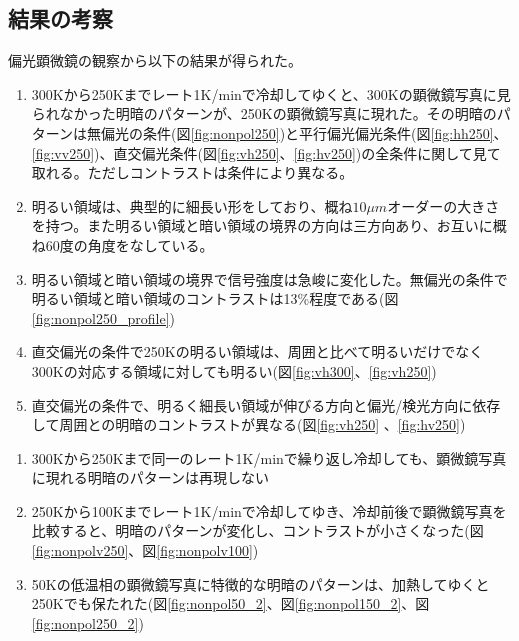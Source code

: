 \documentclass[11pt,a4paper]{jsarticle}
\begin{document}
\subsection{結果の考察}
偏光顕微鏡の観察から以下の結果が得られた。
\begin{description}
\item[300Kと250Kの偏光顕微鏡像の比較]
\item
\begin{enumerate}
\item 300Kから250Kまでレート1K/minで冷却してゆくと、300Kの顕微鏡写真に見られなかった明暗のパターンが、250Kの顕微鏡写真に現れた。その明暗のパターンは無偏光の条件(図\ref{fig:nonpol250})と平行偏光偏光条件(図\ref{fig:hh250}、\ref{fig:vv250})、直交偏光条件(図\ref{fig:vh250}、\ref{fig:hv250})の全条件に関して見て取れる。ただしコントラストは条件により異なる。
\item 明るい領域は、典型的に細長い形をしており、概ね$10 \mu m$オーダーの大きさを持つ。また明るい領域と暗い領域の境界の方向は三方向あり、お互いに概ね60度の角度をなしている。
\item 明るい領域と暗い領域の境界で信号強度は急峻に変化した。無偏光の条件で明るい領域と暗い領域のコントラストは13\%程度である(図\ref{fig:nonpol250_profile})
\item 直交偏光の条件で250Kの明るい領域は、周囲と比べて明るいだけでなく300Kの対応する領域に対しても明るい(図\ref{fig:vh300}、\ref{fig:vh250})
\item 直交偏光の条件で、明るく細長い領域が伸びる方向と偏光/検光方向に依存して周囲との明暗のコントラストが異なる(図\ref{fig:vh250} 、\ref{fig:hv250})
 \end{enumerate}
\item[250Kと50Kの偏光顕微鏡像の比較]
\item 
\begin{enumerate}
\item 300Kから250Kまで同一のレート1K/minで繰り返し冷却しても、顕微鏡写真に現れる明暗のパターンは再現しない
\item 250Kから100Kまでレート1K/minで冷却してゆき、冷却前後で顕微鏡写真を比較すると、明暗のパターンが変化し、コントラストが小さくなった(図\ref{fig:nonpolv250}、図\ref{fig:nonpolv100})
\item 50Kの低温相の顕微鏡写真に特徴的な明暗のパターンは、加熱してゆくと250Kでも保たれた(図\ref{fig:nonpol50_2}、図\ref{fig:nonpol150_2}、図\ref{fig:nonpol250_2})
 \end{enumerate}
 \end{description}
 
\end{document}
